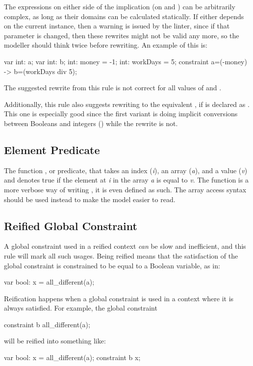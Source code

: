 \documentclass[a4paper,12pt]{article}
\begin{document}
The expressions on either side of the implication (on  and ) can be arbitrarily
complex, as long as their domains can be calculated statically. If either depends on the current
instance, then a warning is issued by the linter, since if that parameter is changed, then these rewrites
might not be valid any more, so the modeller should think twice before rewriting.
An example of this is:
\begin{mznnobreak}
var int: a; var int: b;
int: money = -1;
int: workDays = 5;
constraint a=(-money) -> b=(workDays div 5);
\end{mznnobreak}
\begin{sloppypar}
The suggested rewrite from this rule is not correct for all values of  and .
\end{sloppypar}

\begin{sloppypar}
Additionally, this rule also suggests rewriting  to the
equivalent , if  is declared as . This one is especially good
since the first variant is doing implicit conversions between Booleans and integers
() while the rewrite is not.
\end{sloppypar}

\subsection{Element Predicate}\label{sec:rule:element}
The function , or predicate, that takes an index (\emph{i}), an array
(\emph{a}), and a value (\emph{v}) and denotes true if the element at \emph{i} in the array
\emph{a} is equal to \emph{v}. The function  is a more verbose way of writing
, it is even defined as such. The array
access syntax should be used instead to make the model easier to read.

\subsection{Reified Global Constraint}\label{sec:rule:reifiedglobal}
A global constraint used in a reified context \emph{can} be slow and inefficient,
and this rule will mark all such usages. Being reified means that the satisfaction of the global
constraint is constrained to be equal to a Boolean variable, as in:
\begin{mznnobreak}
var bool: x = all_different(a);
\end{mznnobreak}
Reification happens when a global constraint is used in a context where it is always satisfied.
For example, the global constraint
\begin{mznnobreak}
constraint b \/ all_different(a);
\end{mznnobreak}
will be reified into something like:
\begin{mznnobreak}
var bool: x = all_different(a);
constraint b \/ x;
\end{mznnobreak}
\end{document}
